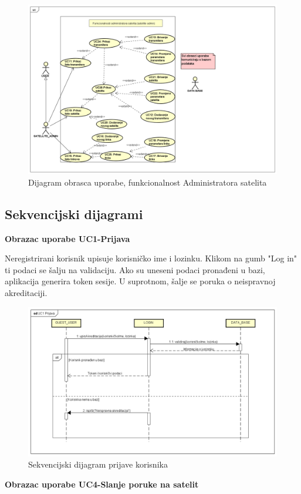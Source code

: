 			\begin{figure}[H]
				\includegraphics[width=\linewidth]{USECASE3.png}
				\caption{Dijagram obrasca uporabe, funkcionalnost Administratora satelita}
				\label{fig:Dijagrami obrazaca uporabe 11-19}
			\end{figure}
					
				\eject		
				
			\subsection{Sekvencijski dijagrami}
				
\textbf{Obrazac uporabe UC1-Prijava}

{Neregistrirani korisnik upisuje korisničko ime i lozinku. Klikom na gumb "Log in" ti podaci se šalju na validaciju. Ako su uneseni podaci pronađeni u bazi, aplikacija generira token sesije. U suprotnom, šalje se poruka o neispravnoj akreditaciji.}

				\begin{figure}[H]
					\includegraphics[width=\linewidth]{Sekvencijski1.png}
					\caption{Sekvencijski dijagram prijave korisnika}
					\label{fig:Sekvencijski prijava}
				\end{figure}
			\newpage
			\textbf{Obrazac uporabe UC4-Slanje poruke na satelit}
			
